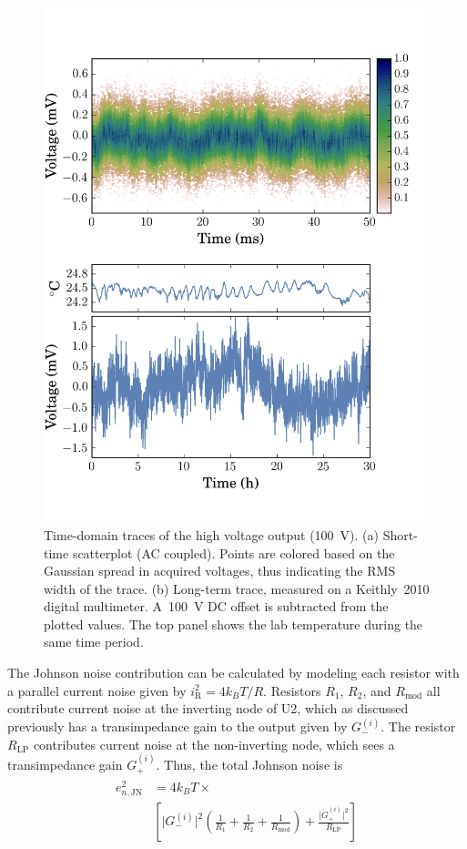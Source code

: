 \documentclass[aip,rsi,reprint]{revtex4-1} %
\begin{document}
\begin{figure}[b]
\includegraphics[width=\columnwidth]{fig/TimeDomain.png}
\caption{Time-domain traces of the high voltage output (\SI{100}{\volt}). (a) Short-time scatterplot  (AC coupled). Points are colored based on the Gaussian spread in acquired voltages, thus indicating the RMS width of the trace. (b) Long-term trace, measured on a Keithly~2010 digital multimeter. A~\SI{100}{\volt} DC offset is subtracted from the plotted values. The top panel shows the lab temperature during the same time period.\label{Fig:TimeDomain}}
\end{figure}

The Johnson noise contribution can be calculated by modeling each resistor with a parallel current noise given by $i_\text{R}^2 = 4k_B T/R$.
Resistors $R_1$, $R_2$, and $R_\text{mod}$ all contribute current noise at the inverting node of U2, which as discussed previously has a transimpedance gain to the output given by $G_{-}^{(i)}$.
The resistor $R_\text{LP}$ contributes current noise at the non-inverting node, which sees a transimpedance gain $G_{+}^{(i)}$.
Thus, the total Johnson noise is
\begin{align}
\begin{split}
e^2_{n,\text{JN}} &= 4 k_B T \times \\
&\left[ \big|G_{-}^{(i)}\big|^2 \left(\frac{1}{R_1} + \frac{1}{R_2} + \frac{1}{R_\text{mod}} \right) + 
\frac{\big|G_{+}^{(i)}\big|^2}{R_\text{LP}} \right]
\end{split}
\end{align}
\end{document}
